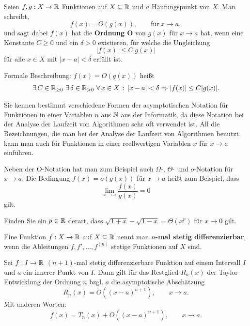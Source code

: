 \begin{defn}  
	Seien $f,g : X \to \mathbb{R}$ Funktionen auf $X \subseteq \mathbb{R}$ und $a$ Häufungspunkt von $X$. Man schreibt, 
	\[
		f(x) = O(g(x)), \qquad \text{für} \ x \to a,
	\] 
	und sagt dabei $f(x)$ hat die \textbf{Ordnung O} von $g(x)$ für $x \to a$ hat, 
	wenn eine Konstante $C\ge 0$ und ein $\delta > 0$ existieren, für welche die Ungleichung 
	\[
		|f(x)| \le C |g(x)| 
	\]
	für alle $x \in X$ mit $|x-a| < \delta$ erfüllt ist. 
		
	Formale Beschreibung: $f(x) = O(g(x))$ heißt
	\[
		\exists \, C \in \mathbb{R}_{\ge 0} \ \exists \, \delta \in \mathbb{R}_{>0} \ \forall \, x \in X \,:\, |x-a| < \delta \Rightarrow |f(x)| \le C |g(x)|.
	\]
\end{defn} 


\begin{bem}
	Sie kennen bestimmt verschiedene Formen der asymptotischen Notation für Funktionen  in einer Variablen $n$ aus $\mathbb{N}$ aus der Informatik, da diese Notation bei der Analyse der Laufzeit von Algorithmen sehr oft verwendet ist. All die Bezeichnungen, die man bei der Analyse der Laufzeit von Algorithmen benutzt, kann man auch für Funktionen in einer reellwertigen Variablen $x$ für $x \to a$ einführen. 
	
	Neben der O-Notation hat man zum Beispiel auch $\Omega$-, $\Theta$- und $o$-Notation für $x \to a$. Die Bedingung $f(x) = o(g(x))$ für $x \to a$ heißt zum Beispiel, dass 
	\[
		\lim_{x \to a} \frac{f(x)}{g(x)} = 0
	\]
	gilt. 
\end{bem} 

\begin{aufg}
	Finden Sie ein $p \in \mathbb{R}$ derart, dass $\sqrt{1+x} - \sqrt{1-x} = \Theta (x^p)$ für $x \to 0$ gilt. 
\end{aufg} 

\begin{defn}
	Eine Funktion $f: X \to \mathbb{R}$ auf $X \subseteq \mathbb{R}$ nennt man \textbf{$n$-mal stetig differenzierbar}, wenn die Ableitungen $f, f',\ldots, f^{(n)}$ stetige Funktionen auf $X$ sind. 
\end{defn} 

\begin{thm}  
	Sei $f : I \to \mathbb{R}$ $(n+1)$-mal stetig differenzierbare Funktion auf einem Intervall $I$  und $a$ ein innerer Punkt von $I$. Dann gilt für das Restglied $R_n(x)$ der Taylor-Entwicklung  der Ordnung $n$ bzgl. $a$ die asymptotische Abschätzung
	\[
		R_n(x) = O( (x-a)^{n+1}), \qquad x \to a. 
	\]
	Mit anderen Worten: 
	\[
		f(x) = T_n(x) + O((x-a)^{n+1}), \qquad x \to a. 
	\]
\end{thm} 

